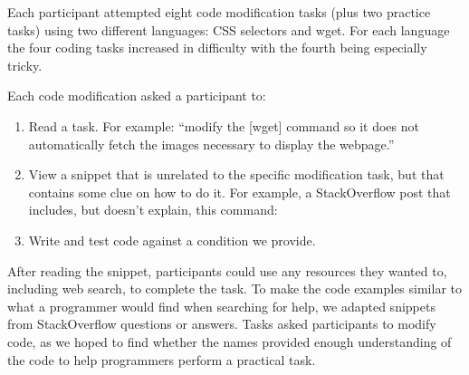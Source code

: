 Each participant attempted eight code modification tasks (plus two practice tasks) using two different languages: CSS selectors and wget.
For each language the four coding tasks increased in difficulty with the fourth being especially tricky.

\begin{changes}
Each code modification asked a participant to:
\begin{enumerate}
    \item Read a task.  For example: ``modify the [wget] command so it does not automatically fetch the images necessary to display the webpage.''
\item View a snippet that is unrelated to the specific modification task, but that contains some clue on how to do it.  For example, a StackOverflow post that includes, but doesn't explain, this command:
\vspace{.2em}
\vspace{.6em}
\item Write and test code against a condition we provide.
\end{enumerate}

After reading the snippet, participants could use any resources they wanted to, including web search, to complete the task.
To make the code examples similar to what a programmer would find when searching for help, we adapted snippets from StackOverflow questions or answers.
Tasks asked participants to modify code, as we hoped to find whether the \Glspl{name} provided enough understanding of the code to help programmers perform a practical task.
\end{changes}

